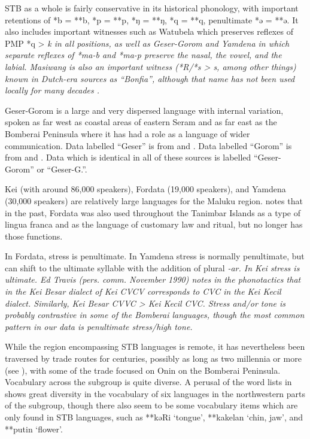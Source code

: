 STB as a whole is fairly conservative in its historical phonology,
with important retentions of *b = **b,
*p = **p, *ŋ = **ŋ,
*q = **q, penultimate *ə = **ə.
It also includes important witnesses such as Watubela which preserves
reflexes of PMP *q > \it{k} in all positions,
as well as Geser-Gorom
and Yamdena in which separate reflexes of *ma-b
and *ma-p preserve the nasal,
the vowel, and the labial.
Masiwang is also an important witness (*R/*s > \it{s},
among other things) known in Dutch-era sources as “Bonfia”,
although that name has not been used locally for many decades \citep[125]{Collins1986}.

Geser-Gorom is a large
and very dispersed language with internal variation,
spoken as far west as coastal areas of eastern Seram
and as far east as the Bomberai Peninsula where it has had a
role as a language of wider communication.
Data labelled “Geser” is from \citet{Collins1986} and \citet{Stokhof1982a}.
Data labelled “Gorom” is from \citet{Kakerissa1986} and \citet{Visser2019a}.
Data which is identical in all of these sources is labelled “Geser-Gorom” or “Geser-G.”.

Kei (with around 86,000 speakers),
Fordata (19,000 speakers), and Yamdena (30,000 speakers) are
relatively large languages for the Maluku region.
\citet[102]{Hughes1987} notes that in the past,
Fordata was also used throughout the Tanimbar Islands as a type
of lingua franca and as the language of customary law
and ritual, but no longer has those functions.

In Fordata, stress is penultimate.
In Yamdena stress is normally penultimate,
but can shift to the ultimate syllable with the addition of plural \it{-ar}.
In Kei stress is ultimate.
Ed Travis (pers. comm.
November 1990) notes in the phonotactics that in the Kei Besar
dialect of Kei CVCV corresponds to CVC in the Kei Kecil dialect.
Similarly, Kei Besar CVVC > Kei Kecil CVC.
Stress and/or tone is probably contrastive in some of the Bomberai
languages, though the most common pattern in our data is penultimate stress/high tone.

While the region encompassing STB languages is remote,
it has nevertheless been traversed by trade routes for centuries,
possibly as long as two millennia or more (see ),
with some of the trade focused on Onin on the Bomberai Peninsula.
Vocabulary across the subgroup is quite diverse.
A perusal of the word lists in \citet[141--146]{Collins1986}
shows great diversity in the vocabulary of six languages in the
northwestern parts of the subgroup,
though there also seem to be some vocabulary items which are
only found in STB languages,
such as **kəRi ‘tongue’,
**kakelan ‘chin, jaw’, and **putin ‘flower’.

